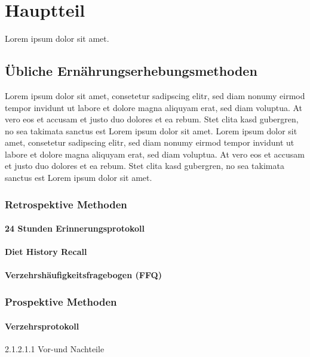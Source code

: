 \section{Hauptteil}
Lorem ipsum dolor sit amet.

\subsection{Übliche Ernährungserhebungsmethoden}
Lorem ipsum dolor sit amet, consetetur sadipscing elitr, sed diam nonumy eirmod tempor invidunt ut labore et dolore magna aliquyam erat, sed diam voluptua. At vero eos et accusam et justo duo dolores et ea rebum. Stet clita kasd gubergren, no sea takimata sanctus est Lorem ipsum dolor sit amet. Lorem ipsum dolor sit amet, consetetur sadipscing elitr, sed diam nonumy eirmod tempor invidunt ut labore et dolore magna aliquyam erat, sed diam voluptua. At vero eos et accusam et justo duo dolores et ea rebum. Stet clita kasd gubergren, no sea takimata sanctus est Lorem ipsum dolor sit amet.

\subsubsection{Retrospektive Methoden}

\paragraph{24 Stunden Erinnerungsprotokoll}


\paragraph{Diet History Recall}


\paragraph{Verzehrshäufigkeitsfragebogen (FFQ)}


\subsubsection{Prospektive Methoden}

\paragraph{Verzehrsprotokoll}
2.1.2.1.1	Vor-und Nachteile

